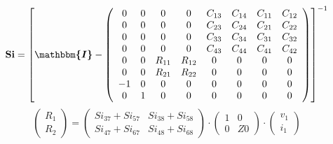 \documentclass[10pt]{article} \usepackage{amsmath} \usepackage{bbold}
\begin{document}
\[ \mathbf{Si} = \left[ \boldsymbol{\mathbbm{I}}  -
\left(\begin{array}{cccccccc} 0 & 0 & 0 & 0 & C_{13} & C_{14} & C_{11}
& C_{12} \\ 0 & 0 & 0 & 0 & C_{23} & C_{24} & C_{21} & C_{22} \\ 0 & 0
& 0 & 0 & C_{33} & C_{34} & C_{31} & C_{32} \\ 0 & 0 & 0 & 0 & C_{43}
& C_{44} & C_{41} & C_{42} \\ 0 & 0 & R_{11} & R_{12} & 0 & 0 & 0 & 0
\\ 0 & 0 & R_{21} & R_{22} & 0 & 0 & 0 & 0 \\ -1 & 0 & 0 & 0 & 0 & 0 &
0 & 0 \\ 0 & 1 & 0 & 0 & 0 & 0 & 0 & 0 \end{array}\right) \right]^{-1}
\]
\[ \left(\begin{array}{c} R_{1} \\ R_{2}
\end{array}\right)=\left(\begin{array}{cc} Si_{37} + Si_{57} & Si_{38}
+ Si_{58} \\ Si_{47} + Si_{67} & Si_{48} + Si_{68} \end{array}\right)
\cdot \left(\begin{array}{cc} 1 & 0 \\ 0 & Z0 \end{array}\right)\cdot
\left(\begin{array}{c} v_{1} \\ i_{1} \end{array}\right) \]
\end{document}
